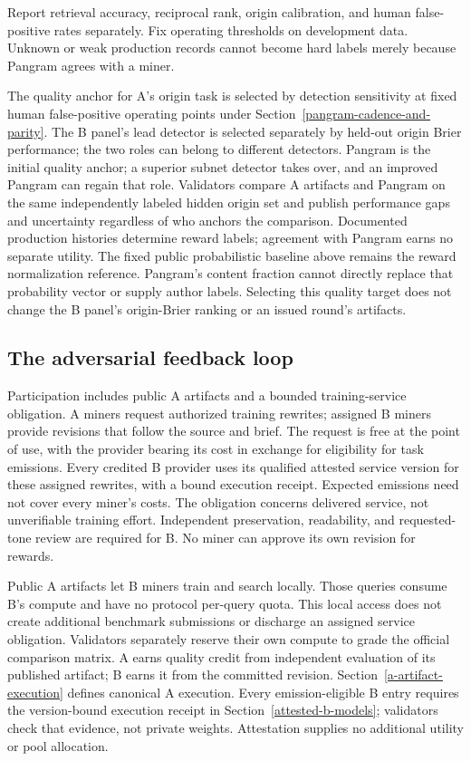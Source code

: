 Report retrieval accuracy, reciprocal rank, origin calibration, and
human false-positive rates separately. Fix operating thresholds on
development data. Unknown or weak production records cannot become hard
labels merely because Pangram agrees with a miner.

The quality anchor for A's origin task is selected by detection sensitivity
at fixed human false-positive operating points under
Section~\ref{pangram-cadence-and-parity}. The B panel's lead detector is
selected separately by held-out origin Brier performance; the two roles
can belong to different detectors. Pangram is the initial quality anchor;
a superior subnet detector takes over, and an improved Pangram can regain
that role. Validators compare A artifacts and Pangram on the same
independently labeled hidden origin set and publish performance gaps
and uncertainty regardless of who anchors the comparison. Documented
production histories determine reward labels;
agreement with Pangram earns no separate utility. The fixed public
probabilistic baseline above remains the reward normalization reference.
Pangram's content fraction cannot directly replace that probability
vector or supply author labels. Selecting this quality target does not
change the B panel's origin-Brier ranking or an issued round's artifacts.

\subsection{The adversarial feedback loop}\label{adversarial-feedback-loop}

Participation includes public A artifacts and a bounded training-service
obligation. A miners request authorized training rewrites; assigned B
miners provide revisions that follow the source and brief. The request
is free at the point of use, with the
provider bearing its cost in exchange for eligibility for task
emissions. Every credited B provider uses its qualified attested service
version for these assigned rewrites, with a bound execution receipt. Expected emissions need not cover every miner's costs. The
obligation concerns delivered service, not unverifiable training effort.
Independent preservation, readability, and requested-tone review are
required for B. No miner can approve its own revision for rewards.

Public A artifacts let B miners train and search locally.
Those queries consume B's compute and
have no protocol per-query quota. This local access does not create
additional benchmark submissions or discharge an assigned service
obligation. Validators separately reserve their own compute to grade the
official comparison matrix. A earns quality credit from independent
evaluation of its published artifact; B earns it from the committed
revision. Section~\ref{a-artifact-execution} defines canonical A execution.
Every emission-eligible B entry requires the version-bound execution receipt in
Section~\ref{attested-b-models}; validators check that evidence, not private
weights. Attestation supplies no additional utility or pool allocation.


